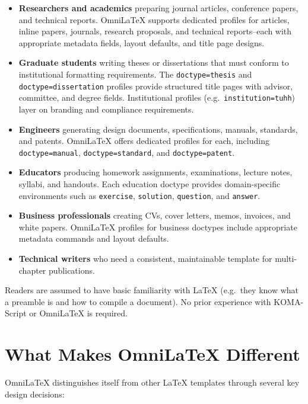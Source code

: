 \begin{itemize}
    \item \textbf{Researchers and academics} preparing journal articles,
          conference papers, and technical reports.  OmniLaTeX supports
          dedicated profiles for articles, inline papers, journals, research
          proposals, and technical reports--each with appropriate metadata
          fields, layout defaults, and title page designs.
    \item \textbf{Graduate students} writing theses or dissertations that must
          conform to institutional formatting requirements.  The
          \texttt{doctype=thesis} and \texttt{doctype=dissertation} profiles
          provide structured title pages with advisor, committee, and degree
          fields.  Institutional profiles (e.g.\ \texttt{institution=tuhh})
          layer on branding and compliance requirements.
    \item \textbf{Engineers} generating design documents, specifications,
          manuals, standards, and patents.  OmniLaTeX offers dedicated profiles
          for each, including \texttt{doctype=manual},
          \texttt{doctype=standard}, and \texttt{doctype=patent}.
    \item \textbf{Educators} producing homework assignments, examinations,
          lecture notes, syllabi, and handouts.  Each education doctype
          provides domain-specific environments such as \texttt{exercise},
          \texttt{solution}, \texttt{question}, and \texttt{answer}.
    \item \textbf{Business professionals} creating CVs, cover letters,
          memos, invoices, and white papers.  OmniLaTeX profiles for business
          doctypes include appropriate metadata commands and layout defaults.
    \item \textbf{Technical writers} who need a consistent, maintainable
          template for multi-chapter publications.
\end{itemize}

Readers are assumed to have basic familiarity with \LaTeX{} (e.g.\ they know
what a preamble is and how to compile a document).  No prior experience with
KOMA-Script or OmniLaTeX is required.

\section{What Makes OmniLaTeX Different}

OmniLaTeX distinguishes itself from other \LaTeX{} templates through several
key design decisions:

